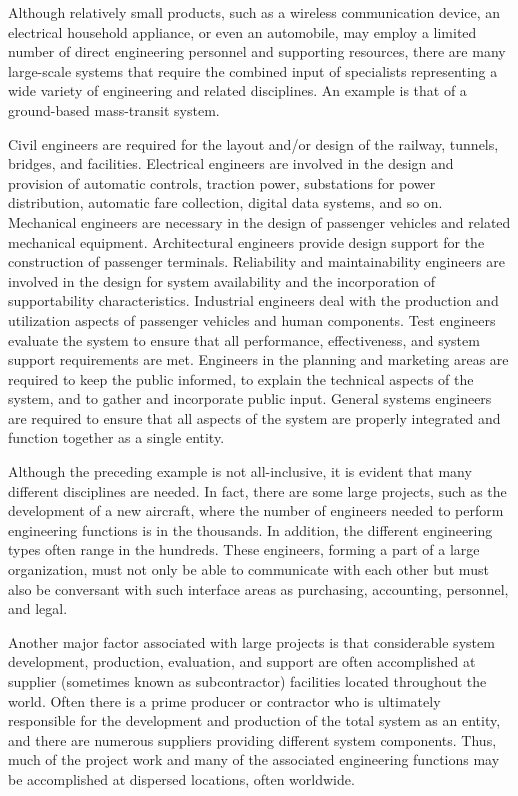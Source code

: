 Although relatively small products, such as a wireless communication device, an electrical household appliance, or even an automobile, may employ a limited number of direct engineering personnel and supporting resources, there are many large-scale systems that require the combined input of specialists representing a wide variety of engineering and related disciplines. An example is that of a ground-based mass-transit system.

Civil engineers are required for the layout and/or design of the railway, tunnels, bridges, and facilities. Electrical engineers are involved in the design and provision of automatic controls, traction power, substations for power distribution, automatic fare collection, digital data systems, and so on. Mechanical engineers are necessary in the design of passenger vehicles and related mechanical equipment. Architectural engineers provide design support for the construction of passenger terminals. Reliability and maintainability engineers are involved in the design for system availability and the incorporation of supportability characteristics. Industrial engineers deal with the production and utilization aspects of passenger vehicles and human components. Test engineers evaluate the system to ensure that all performance, effectiveness, and system support requirements are met. Engineers in the planning and marketing areas are required to keep the public informed, to explain the technical aspects of the system, and to gather and incorporate public input. General systems engineers are required to ensure that all aspects of the system are properly integrated and function together as a single entity.

Although the preceding example is not all-inclusive, it is evident that many different disciplines are needed. In fact, there are some large projects, such as the development of a new aircraft, where the number of engineers needed to perform engineering functions is in the thousands. In addition, the different engineering types often range in the hundreds. These engineers, forming a part of a large organization, must not only be able to communicate with each other but must also be conversant with such interface areas as purchasing, accounting, personnel, and legal.

Another major factor associated with large projects is that considerable system development, production, evaluation, and support are often accomplished at supplier (sometimes known as subcontractor) facilities located throughout the world. Often there is a prime producer or contractor who is ultimately responsible for the development and production of the total system as an entity, and there are numerous suppliers providing different system components. Thus, much of the project work and many of the associated engineering functions may be accomplished at dispersed locations, often worldwide.

